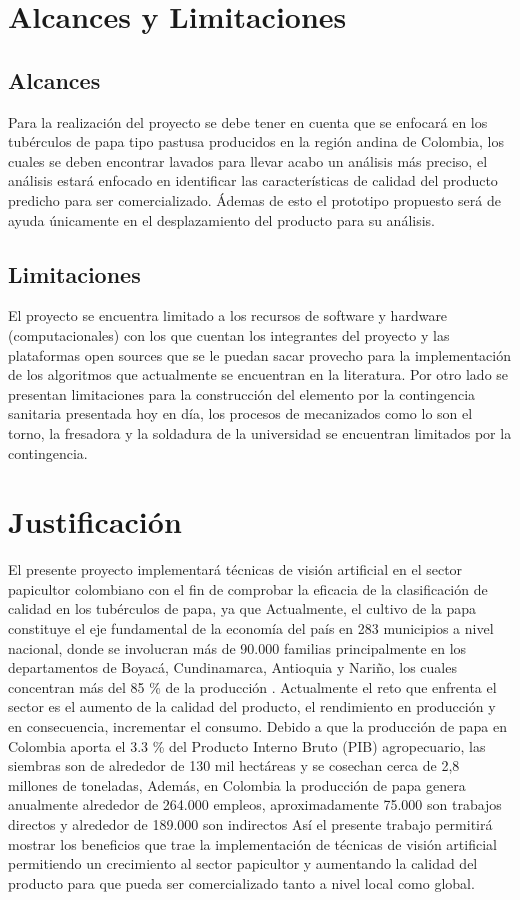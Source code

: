 \section{Alcances y Limitaciones}

\subsection{Alcances}

Para la realización del proyecto se debe tener en cuenta que se enfocará en los tubérculos de papa tipo pastusa producidos en la región andina de Colombia, los cuales se deben encontrar lavados para llevar acabo un análisis más preciso, el análisis estará enfocado en identificar las características de calidad del producto predicho para ser comercializado. Ádemas de esto el prototipo propuesto será de ayuda únicamente en el desplazamiento del producto para su análisis. 

\subsection{Limitaciones}


El proyecto se encuentra limitado a los recursos de software y hardware (computacionales) con los que cuentan los integrantes del proyecto y las plataformas open sources que se le puedan sacar provecho para la implementación de los algoritmos que actualmente se encuentran en la literatura. Por otro lado se presentan limitaciones para la construcción del elemento por la contingencia sanitaria presentada hoy en día, los procesos de mecanizados como lo son el torno, la fresadora y la soldadura de la universidad se encuentran limitados por la contingencia.


\section{Justificación}
El presente proyecto implementará técnicas de visión artificial en el sector papicultor colombiano con el fin de comprobar la eficacia de la clasificación de calidad en los tubérculos de papa, ya que Actualmente, el cultivo de la papa constituye el eje fundamental de la economía del país en 283 municipios a nivel nacional, donde se involucran más de 90.000 familias principalmente en los departamentos de Boyacá, Cundinamarca, Antioquia y Nariño, los cuales concentran más del 85 \% de la producción \cite{referencia1}.
Actualmente el reto que enfrenta el sector es el aumento de la calidad del producto, el rendimiento en producción y en consecuencia, incrementar el consumo. Debido a que la producción de papa en Colombia aporta el 3.3 \% del Producto Interno Bruto (PIB) agropecuario, las siembras son de alrededor de 130 mil hectáreas y se cosechan cerca de 2,8 millones de toneladas, Además, en Colombia la producción de papa genera anualmente alrededor de 264.000 empleos, aproximadamente 75.000 son trabajos directos y alrededor de 189.000 son indirectos \cite{referencia2}
Así el presente trabajo permitirá mostrar los beneficios que trae la implementación de técnicas de visión artificial permitiendo un crecimiento al sector papicultor y aumentando la calidad del producto para que pueda ser comercializado tanto a nivel local como global.


